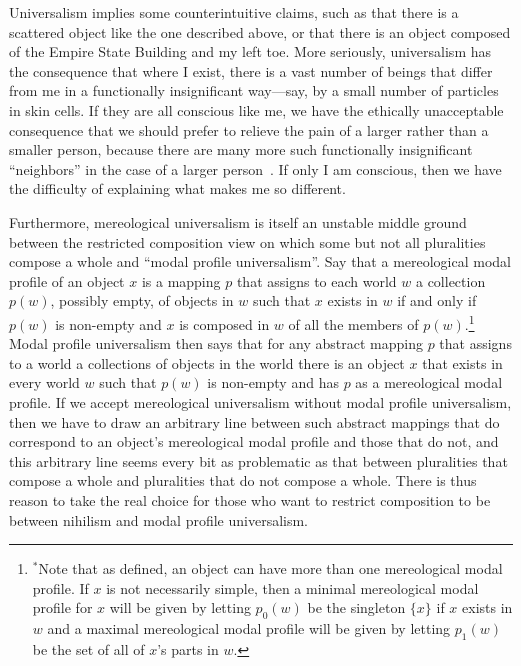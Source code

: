 Universalism implies some counterintuitive claims, such as that there is a scattered object
like the one described above, or that there is an object composed of the Empire State Building
and my left toe. More seriously, universalism has the consequence that where I exist, there
is a vast number of beings that differ from me in a functionally insignificant way---say, 
by a small number of particles in skin cells. If they are all conscious like me, we have the 
ethically unacceptable consequence that we should prefer to relieve the pain of a larger
rather than a smaller person, because there are many more such functionally insignificant 
``neighbors'' in the case of a larger person~. If only I am conscious, then we have the
difficulty of explaining what makes me so different.

Furthermore, mereological universalism is itself an unstable middle ground between 
the restricted composition view on which some but not all pluralities compose a whole
and ``modal profile universalism''. Say that a mereological modal profile of an object $x$ 
is a mapping $p$ that assigns to each world $w$ a collection $p(w)$, possibly empty, of 
objects in $w$ such that $x$ exists in $w$ if and only if $p(w)$ is non-empty and $x$
is composed in $w$ of all the members of $p(w)$.\footnote{$^*$Note that as defined, an object
can have more than one mereological modal profile. If $x$ is not necessarily simple, then
a minimal mereological modal profile for $x$ will be given by letting $p_0(w)$ be the singleton
$\{ x \}$ if $x$ exists in $w$ and a maximal mereological modal profile will be given by 
letting $p_1(w)$ be the set of all of $x$'s parts in $w$.}
Modal profile universalism then says that for any abstract mapping $p$ that assigns to a world
a collections of objects in the world there is an object $x$ that exists in every world $w$ such that
$p(w)$ is non-empty and has $p$ as a mereological modal profile. If we accept mereological
universalism without modal profile universalism, then we have to draw an arbitrary line between
such abstract mappings that do correspond to an object's mereological modal profile and those that
do not, and this arbitrary line seems every bit as problematic as that between pluralities that
compose a whole and pluralities that do not compose a whole. There is thus reason to take the
real choice for those who want to restrict composition to be between nihilism and modal profile
universalism.

